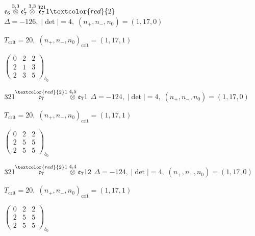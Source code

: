 \documentclass[10pt]{article}
\begin{document}
\smallskip

$\mathfrak{e}_6\overset{3,3}{\otimes}\mathfrak{e}_7'\overset{3,3}{\otimes}\overset{321}{\mathfrak{e}_7}1\textcolor{red}{2}$ \quad $\Delta=-126,\; |\det|=4,\; (n_+,n_-,n_0)=(1,17,0)$

\hspace{1em}$T_{\text{crit}}=20,\; (n_+,n_-,n_0)_{\text{crit}}=(1,17,1)$

\hspace{2em}$\left(\begin{smallmatrix}0 & 2 & 2 \\ 2 & 1 & 3 \\ 2 & 3 & 5\end{smallmatrix}\right)_{\!b_0}$

\smallskip

$321\overset{\textcolor{red}{2}1}{\mathfrak{e}_7}\overset{4,5}{\otimes}\mathfrak{e}_71$ \quad $\Delta=-124,\; |\det|=4,\; (n_+,n_-,n_0)=(1,17,0)$

\hspace{1em}$T_{\text{crit}}=20,\; (n_+,n_-,n_0)_{\text{crit}}=(1,17,1)$

\hspace{2em}$\left(\begin{smallmatrix}0 & 2 & 2 \\ 2 & 5 & 5 \\ 2 & 5 & 5\end{smallmatrix}\right)_{\!b_0}$

\smallskip

$321\overset{\textcolor{red}{2}1}{\mathfrak{e}_7}\overset{4,4}{\otimes}\mathfrak{e}_712$ \quad $\Delta=-124,\; |\det|=4,\; (n_+,n_-,n_0)=(1,17,0)$

\hspace{1em}$T_{\text{crit}}=20,\; (n_+,n_-,n_0)_{\text{crit}}=(1,17,1)$

\hspace{2em}$\left(\begin{smallmatrix}0 & 2 & 2 \\ 2 & 5 & 5 \\ 2 & 5 & 5\end{smallmatrix}\right)_{\!b_0}$
\end{document}
